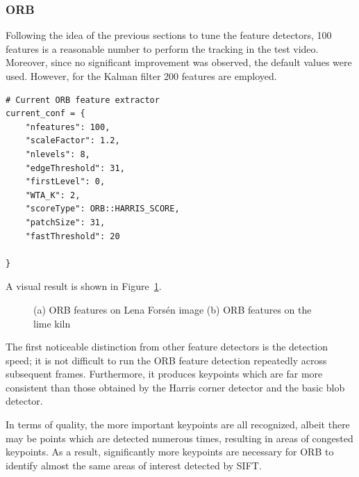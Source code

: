 \documentclass[journal]{IEEEtran}
\begin{document}
\subsubsection{ORB}

Following the idea of the previous sections to tune the feature detectors, 100 features is a reasonable number to perform the tracking in the test video. Moreover, since no significant improvement was observed, the default values were used. However, for the Kalman filter 200 features are employed.

\begin{verbatim}
# Current ORB feature extractor
current_conf = {
    "nfeatures": 100,
    "scaleFactor": 1.2,
    "nlevels": 8,
    "edgeThreshold": 31,
    "firstLevel": 0,
    "WTA_K": 2,
    "scoreType": ORB::HARRIS_SCORE,
    "patchSize": 31,
    "fastThreshold": 20 

}
\end{verbatim}

A visual result is shown in Figure~\ref{fig:orb}.

\begin{figure}
\centering
    \caption{(a) ORB features on Lena Forsén image (b) ORB features on the lime kiln}
    \label{fig:orb}
\end{figure}

The first noticeable distinction from other feature detectors is the detection speed; it is not difficult to run the ORB feature detection repeatedly across subsequent frames.
Furthermore, it produces keypoints which are far more consistent than those obtained by the Harris corner detector and the basic blob detector.

In terms of quality, the more important keypoints are all recognized, albeit there may be points which are detected numerous times, resulting in areas of congested keypoints. As a result, significantly more keypoints are necessary for ORB to identify almost the same areas of interest detected by SIFT. 
\end{document}
